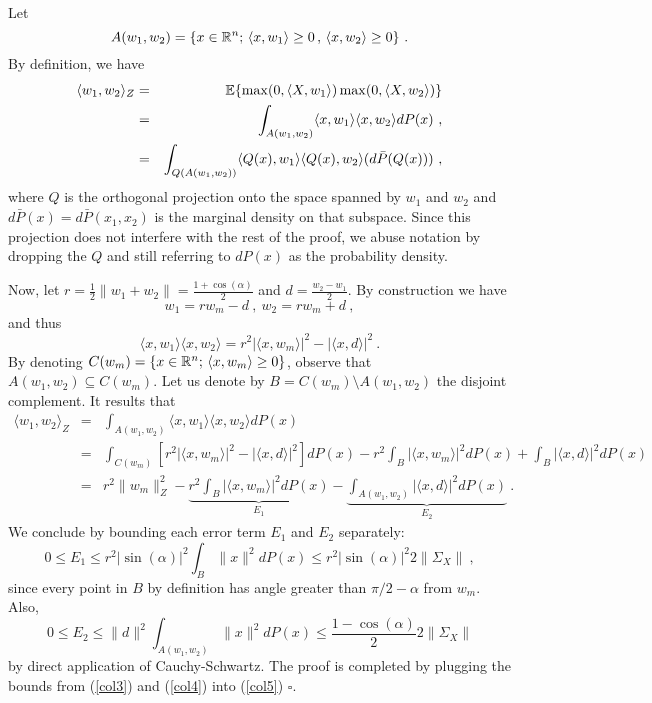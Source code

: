 Let 
$$A(w_1, w_2) = \{ x \in {\mathbb{R}}^n; \, \langle x, w_1 \rangle \geq 0\,,\, \langle x, w_2 \rangle \geq 0\}~.$$
By definition, we have 
\begin{eqnarray}
\label{col1}
\langle w_1, w_2 \rangle_Z &=& {\mathbb{E}} \{ \max(0, \langle X, w_1 \rangle ) \max(0, \langle X, w_2 \rangle ) \} \\
&=& \int_{A(w_1, w_2)} \langle x, w_1 \rangle  \langle x, w_2 \rangle dP(x)~, \\
&=& \int_{Q({A}(w_1, w_2))}  \langle Q(x), w_1 \rangle  \langle Q(x), w_2 \rangle (d\bar{P}(Q(x)))~,  
\end{eqnarray}
where $Q$ is the orthogonal projection onto the space spanned by $w_1$ and $w_2$ and
 $d\bar{P}(x)=d\bar{P}(x_1, x_2)$ is the marginal density on that subspace. 
 Since this projection does not interfere with the rest of the proof, we abuse notation by dropping the $Q$ and still referring to $dP(x)$ as the probability density.

Now, let $r = \frac{1}{2}\| w_1 + w_2 \| = \frac{1 + \cos(\alpha)}{2}$ and $d = \frac{w_2 - w_1}{2}$.
By construction we have 
$$w_1 = r w_m - d~,~ w_2 = r w_m + d~,$$
and thus 
\begin{equation}
\label{col2}
\langle x, w_1 \rangle  \langle x, w_2 \rangle = r^2 | \langle x, w_m \rangle |^2 - | \langle x, d \rangle |^2~.
\end{equation}
By denoting $C(w_m) = \{ x \in {\mathbb{R}}^n;\, \langle x, w_m \rangle \geq 0 \}$, 
observe that $A(w_1, w_2 ) \subseteq C(w_m)$. Let us denote by $B = C(w_m) \setminus A(w_1, w_2) $ the disjoint complement. It results that 
\begin{eqnarray}
\label{col5}
\langle w_1, w_2 \rangle_Z &=& \int_{A(w_1, w_2)} \langle x, w_1 \rangle  \langle x, w_2 \rangle dP(x) \nonumber \\
&=& \int_{C(w_m)} [r^2 | \langle x, w_m \rangle |^2 - | \langle x, d \rangle |^2 ] dP(x) - r^2 \int_B  | \langle x, w_m \rangle |^2 dP(x) + \int_B  | \langle x, d \rangle |^2  dP(x) \nonumber \\ 
&=& r^2 \| w_m \|_Z^2 - \underbrace{ r^2 \int_B  | \langle x, w_m \rangle |^2 dP(x)}_{E_1} - \underbrace{\int_{A(w_1, w_2)} | \langle x, d \rangle |^2  dP(x) }_{E_2}~. 
\end{eqnarray} 
We conclude by bounding each error term $E_1$ and $E_2$ separately:
\begin{equation}
\label{col3}
0 \leq E_1 \leq r^2 |\sin(\alpha)|^2 \int_B \| x \|^2 dP(x) \leq r^2 |\sin(\alpha)|^2 2 \| \Sigma_X\|~,
\end{equation}
since every point in $B$ by definition has angle greater than $\pi/2 - \alpha$ from $w_m$. Also,
\begin{equation}
\label{col4}
0 \leq E_2 \leq \|d \|^2 \int_{A(w_1, w_2)} \| x \|^2 dP(x) \leq \frac{1 - \cos(\alpha)}{2} 2 \| \Sigma_X \|
\end{equation}
by direct application of Cauchy-Schwartz. The proof is completed by plugging the bounds from (\ref{col3}) and (\ref{col4}) into (\ref{col5})  $\square$.


